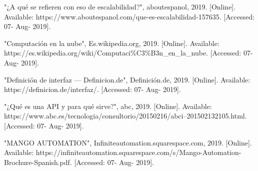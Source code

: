 \begin{thebibliography}{10}
	"¿A qué se refieren con eso de escalabilidad?", aboutespanol, 2019. [Online]. Available: https://www.aboutespanol.com/que-es-escalabilidad-157635. [Accessed: 07- Aug- 2019].
	
	"Computación en la nube", Es.wikipedia.org, 2019. [Online]. Available: https://es.wikipedia.org/wiki/Computaci\%C3\%B3n\_en\_la\_nube. [Accessed: 07- Aug- 2019].
	
	 "Definición de interfaz — Definicion.de", Definición.de, 2019. [Online]. Available: https://definicion.de/interfaz/. [Accessed: 07- Aug- 2019].
	
	 "¿Qué es una API y para qué sirve?", abc, 2019. [Online]. Available: https://www.abc.es/tecnologia/consultorio/20150216/abci--201502132105.html. [Accessed: 07- Aug- 2019].
	
	 "MANGO AUTOMATION", Infiniteautomation.squarespace.com, 2019. [Online]. Available: https://infiniteautomation.squarespace.com/s/Mango-Automation-Brochure-Spanish.pdf. [Accessed: 07- Aug- 2019].
	
	

\end{thebibliography}
\newpage